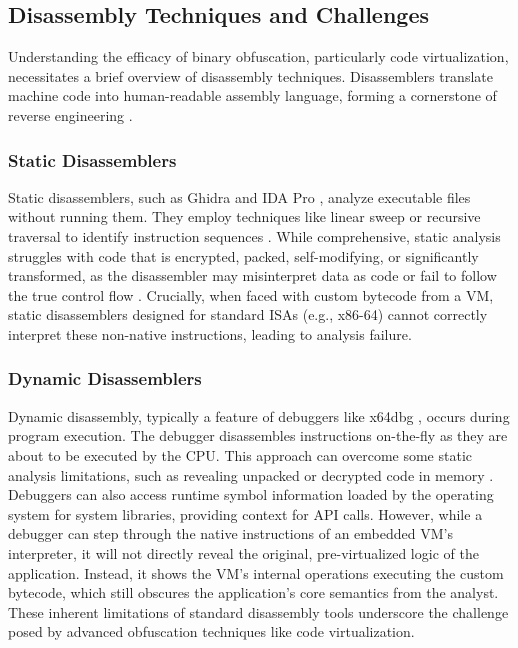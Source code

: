 \subsection{Disassembly Techniques and Challenges}
Understanding the efficacy of binary obfuscation, particularly code virtualization, necessitates a brief overview of disassembly techniques. Disassemblers translate machine code into human-readable assembly language, forming a cornerstone of reverse engineering \cite{Sikorski2012}.

\subsubsection{Static Disassemblers}
Static disassemblers, such as Ghidra \cite{Nat19} and IDA Pro \cite{Hex91}, analyze executable files without running them. They employ techniques like linear sweep or recursive traversal to identify instruction sequences \cite{Eilam2011, Ko2007}. While comprehensive, static analysis struggles with code that is encrypted, packed, self-modifying, or significantly transformed, as the disassembler may misinterpret data as code or fail to follow the true control flow \cite{Sikorski2012, Blazytko2017}. Crucially, when faced with custom bytecode from a VM, static disassemblers designed for standard ISAs (e.g., x86-64) cannot correctly interpret these non-native instructions, leading to analysis failure.

\subsubsection{Dynamic Disassemblers}
Dynamic disassembly, typically a feature of debuggers like x64dbg \cite{Dun14}, occurs during program execution. The debugger disassembles instructions on-the-fly as they are about to be executed by the CPU. This approach can overcome some static analysis limitations, such as revealing unpacked or decrypted code in memory \cite{Sikorski2012}. Debuggers can also access runtime symbol information loaded by the operating system for system libraries, providing context for API calls. However, while a debugger can step through the native instructions of an embedded VM's interpreter, it will not directly reveal the original, pre-virtualized logic of the application. Instead, it shows the VM's internal operations executing the custom bytecode, which still obscures the application's core semantics from the analyst. These inherent limitations of standard disassembly tools underscore the challenge posed by advanced obfuscation techniques like code virtualization.

